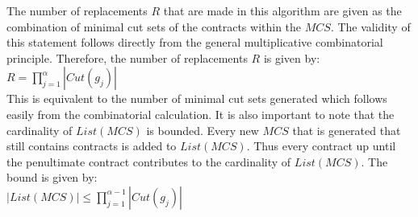 The number of replacements $R$ that are made in this algorithm are given as the combination of minimal cut sets of the contracts within the $MCS$. The validity of this statement follows directly from the general multiplicative combinatorial principle. Therefore, the number of replacements $R$ is given by:\\

$R = {\displaystyle \prod_{j=1}^{\alpha } |Cut(g_j)|}$ \\

This is equivalent to the number of minimal cut sets generated which follows easily from the combinatorial calculation. It is also important to note that the cardinality of $List(MCS)$ is bounded. Every new $MCS$ that is generated that still contains contracts is added to $List(MCS)$. Thus every contract up until the penultimate contract contributes to the cardinality of $List(MCS)$. The bound is given by: \\

$|List(MCS)| \leq {\displaystyle \prod_{j=1}^{\alpha -1} |Cut(g_j)|}$\\

